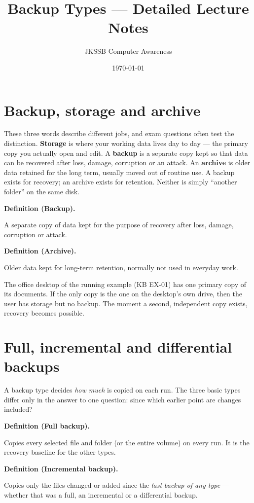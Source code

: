 \documentclass[11pt]{article}
\title{Backup Types --- Detailed Lecture Notes}
\author{JKSSB Computer Awareness}
\date{\today}
\newenvironment{definitionbox}[1]{%
  \par\noindent\textbf{Definition (#1).}\ \itshape
}{\par\vspace{0.3em}}
\begin{document}
\maketitle

\section{Backup, storage and archive}
These three words describe different jobs, and exam questions often test the
distinction. \textbf{Storage} is where your working data lives day to day ---
the primary copy you actually open and edit. A \textbf{backup} is a separate
copy kept so that data can be recovered after loss, damage, corruption or an
attack. An \textbf{archive} is older data retained for the long term, usually
moved out of routine use. A backup exists for recovery; an archive exists for
retention. Neither is simply ``another folder'' on the same disk.

\begin{definitionbox}{Backup}
A separate copy of data kept for the purpose of recovery after loss, damage,
corruption or attack.
\end{definitionbox}

\begin{definitionbox}{Archive}
Older data kept for long-term retention, normally not used in everyday work.
\end{definitionbox}

The office desktop of the running example (KB EX-01) has one primary copy of
its documents. If the only copy is the one on the desktop's own drive, then
the user has storage but no backup. The moment a second, independent copy
exists, recovery becomes possible.

\section{Full, incremental and differential backups}
A backup type decides \emph{how much} is copied on each run. The three basic
types differ only in the answer to one question: since which earlier point are
changes included?

\begin{definitionbox}{Full backup}
Copies every selected file and folder (or the entire volume) on every run.
It is the recovery baseline for the other types.
\end{definitionbox}

\begin{definitionbox}{Incremental backup}
Copies only the files changed or added since the \emph{last backup of any
type} --- whether that was a full, an incremental or a differential backup.
\end{definitionbox}
\end{document}
